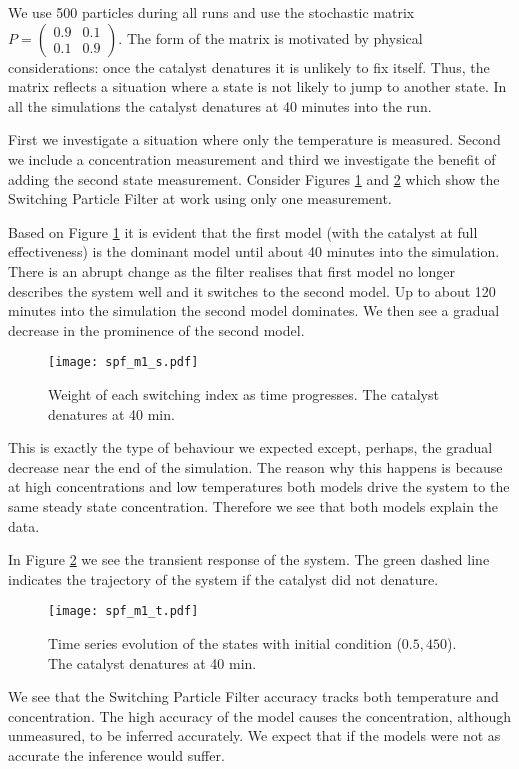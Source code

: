 We use 500 particles during all runs and use the stochastic matrix $P=\begin{pmatrix}
0.9 & 0.1 \\ 0.1 & 0.9
\end{pmatrix}.$ The form of the matrix is motivated by physical considerations: once the catalyst denatures it is unlikely to fix itself. Thus, the matrix reflects a situation where a state is not likely to jump to another state. In all the simulations the catalyst denatures at 40 minutes into the run.

First we investigate a situation where only the temperature is measured. Second we include a concentration measurement and third we investigate the benefit of adding the second state measurement. Consider Figures \ref{fig_spf_m1_s} and \ref{fig_spf_m1_t} which show the Switching Particle Filter at work using only one measurement. 

Based on Figure \ref{fig_spf_m1_s} it is evident that the first model (with the catalyst at full effectiveness) is the dominant model until about 40 minutes into the simulation. There is an abrupt change as the filter realises that first model no longer describes the system well and it switches to the second model. Up to about 120 minutes into the simulation the second model dominates. We then see a gradual decrease in the prominence of the second model. 
\begin{figure}[H] 
\centering
\texttt{[image: spf\_m1\_s.pdf]}
\caption{Weight of each switching index as time progresses. The catalyst denatures at 40 min.}
\label{fig_spf_m1_s}
\end{figure}
This is exactly the type of behaviour we expected except, perhaps, the gradual decrease near the end of the simulation. The reason why this happens is because at high concentrations and low temperatures both models drive the system to the same steady state concentration. Therefore we see that both models explain the data.

In Figure \ref{fig_spf_m1_t} we see the transient response of the system. The green dashed line indicates the trajectory of the system if the catalyst did not denature.  
\begin{figure}[H] 
\centering
\texttt{[image: spf\_m1\_t.pdf]}
\caption{Time series evolution of the states with initial condition ($0.5, 450$). The catalyst denatures at 40 min.}
\label{fig_spf_m1_t}
\end{figure}
We see that the Switching Particle Filter accuracy tracks both temperature and concentration. The high accuracy of the model causes the concentration, although unmeasured, to be inferred accurately. We expect that if the models were not as accurate the inference would suffer.

